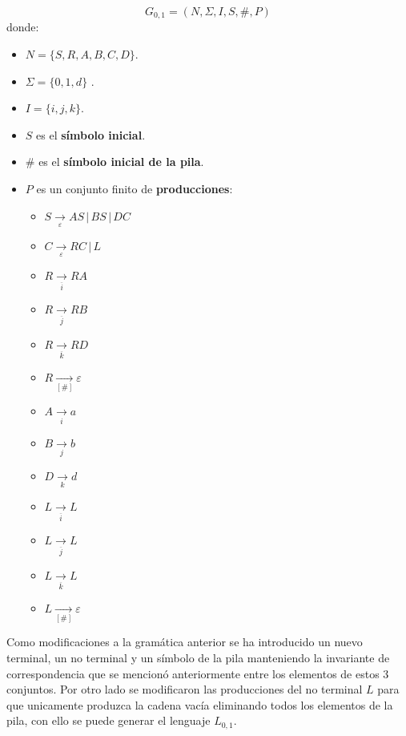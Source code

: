 \documentclass[12pt]{article}
\begin{document}
$$
    G_{0,1} = (N, \Sigma, I, S, \#, P) 
$$
donde:

\begin{itemize}
    \item $N= \{S,R,A,B,C,D\}$.
    \item \( \Sigma=\{0,1,d\} \) .
    \item $I=\{i,j,k\}$.
    \item $S$ es el \textbf{símbolo inicial}.
    \item $\#$ es el \textbf{símbolo inicial de la pila}.
    \item $P$ es un conjunto finito de \textbf{producciones}:
          \begin{multicols}{2}
              \begin{itemize}
                  \item $S\underset{\varepsilon}{\to} AS\,|\,BS\,|\,DC$
                  \item $C\underset{\varepsilon}{\to} RC\,|\,L$
                  \item $R\underset{\overline{i}}{\to} RA$
                  \item $R\underset{\overline{j}}{\to} RB$
                  \item $R\underset{\overline{k}}{\to} RD$
                        
                  \item $R\underset{[\#]}{\to} \varepsilon$
                  \item $A\underset{i}{\to} a$
                  \item $B\underset{j}{\to} b$
                  \item $D\underset{k}{\to} d$
                  \item $L\underset{\overline{i}}{\to} L$
                  \item $L\underset{\overline{j}}{\to} L$
                  \item $L\underset{\overline{k}}{\to} L$
                  \item $L\underset{[\#]}{\to} \varepsilon$
              \end{itemize}
          \end{multicols}
\end{itemize}

Como modificaciones a la gramática anterior se ha introducido un nuevo terminal, 
un no terminal y un símbolo de la pila manteniendo la invariante de correspondencia 
que se mencionó anteriormente entre los elementos de estos 3 conjuntos. Por otro lado se modificaron 
las producciones del no terminal $L$ para que unicamente produzca la cadena vacía eliminando todos los elementos de la pila, 
con ello se puede generar el lenguaje $L_{0,1}$.
\end{document}

